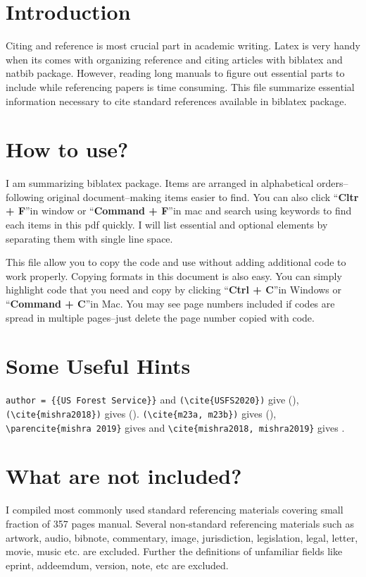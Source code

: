 \documentclass{article}
\begin{document}
\begin{multicols}{2}
\section*{Introduction}
Citing and reference is most crucial part in academic writing. Latex is very handy when its comes with organizing reference and citing articles with biblatex and natbib package. However, reading long manuals to figure out essential parts to include while referencing papers is time consuming. This file summarize essential information necessary to cite standard references available in biblatex package.

\section*{How to use?}
I am summarizing biblatex package. Items are arranged in alphabetical orders--following original document--making items easier to find. You can also click \textquotedblleft \textbf{Cltr + F}\textquotedblright in window or \textquotedblleft \textbf{Command + F}\textquotedblright in mac and search using keywords to find each items in this pdf quickly. I will list essential and optional elements by separating them with single line space.

This file allow you to copy the code and use without adding additional code to work properly. Copying formats in this document is also easy. You can simply highlight code that you need and copy by clicking \textquotedblleft \textbf{Ctrl + C}\textquotedblright in Windows or \textquotedblleft \textbf{Command + C}\textquotedblright in Mac. You may see page numbers included if codes are spread in multiple pages--just delete the page number copied with code.

\section*{Some Useful Hints}
\verb|author = {{US Forest Service}}| and \verb|(\cite{USFS2020})| give (\cite{USFS2020}), \verb|(\cite{mishra2018})| gives (\cite{mishra2018}). \verb|(\cite{m23a, m23b})| gives (\cite{m23a, m23b}), \verb|\parencite{mishra 2019}| gives \parencite{mishra2019} and \verb|\cite{mishra2018, mishra2019}| gives \cite{mishra2018, mishra2019}.

\section*{What are not included?}
I compiled most commonly used standard referencing materials covering small fraction of 357 pages manual. Several non-standard referencing materials such as artwork, audio, bibnote, commentary, image, jurisdiction, legislation, legal, letter, movie, music etc. are excluded. Further the definitions of unfamiliar fields like eprint, addeemdum, version, note, etc are excluded.


\end{multicols}
\end{document}
